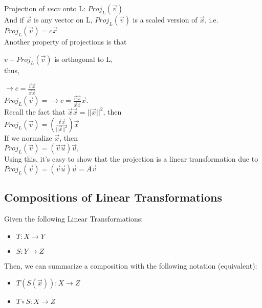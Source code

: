 Projection of $vec{v}$ onto L: $Proj_L(\vec{v})$
\\

And if $\vec{x}$ is any vector on L, $Proj_L(\vec{v})$ is a scaled version of $\vec{x}$, i.e.
\\

$Proj_L(\vec{v}) = c\vec{x}$
\\

Another property of projections is that

$v - Proj_L(\vec{v})$ is orthogonal to L,
\\

thus,

$\rightarrow c = \frac{\vec{v}\vec{x}}{\vec{x}\vec{x}}$
\\

$Proj_L(\vec{v}) = \rightarrow c = \frac{\vec{v}\vec{x}}{\vec{x}\vec{x}}\vec{x}$.
\\

Recall the fact that $\vec{x}\vec{x} = ||\vec{x}||^2$, then
\\

$Proj_L(\vec{v}) = (\frac{\vec{v}\vec{x}}{||\vec{x}||^2})\vec{x}$
\\

If we normalize $\vec{x}$, then
\\

$Proj_L(\vec{v}) = (\vec{v} \vec{u})\vec{u}$,
\\

Using this, it's easy to show that the projection is a linear transformation due to
\\

$Proj_L(\vec{v}) = (\vec{v} \vec{u})\vec{u} = A \vec{v}$

\subsection{Compositions of Linear Transformations}\label{concept3.6}

Given the following Linear Transformations:
\begin{itemize}
	\item $T: X \rightarrow Y$
	\item $S: Y \rightarrow Z$
\end{itemize}

Then, we can summarize a composition with the following notation (equivalent):
\begin{itemize}
	\item $T(S(\vec{x})): X \rightarrow Z$
	\item $T \circ S: X \rightarrow Z$
\end{itemize}

